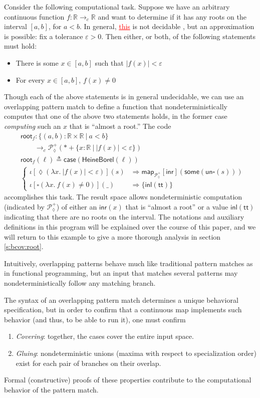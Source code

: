 \documentclass[conference]{IEEEtran}
\newcommand{\PLower}{\mathcal{P}_\lozenge}
\newcommand{\cto}{\to_c}
\newcommand{\R}{\mathbb{R}}
\newcommand{\map}[2]{\mathsf{map}_{#1}[{#2}]}
\newcommand{\fun}[2]{\lambda {#1}.\  {#2}}
\newcommand{\suchthat}{\ |\ }
\newcommand{\One}{\ast}
\newcommand{\wildcard}{\_}
\newcommand{\oinclf}[1]{\iota[{#1}]}
\newcommand{\oincl}[2]{\oinclf{#1} \left({#2}\right)}
\newcommand{\Branch}{\Rightarrow}
\newcommand{\RootFindingCode}{
&\mathsf{root}_f : \{ (a, b) : \R \times \R \suchthat a < b \}
  \\ &\qquad \cto \PLower^+(\One + \{ x : \R \suchthat |f(x)| < \varepsilon \})
\\ &\mathsf{root}_f(\ell) \triangleq \mathsf{case}(\mathsf{HeineBorel}(\ell))
\\ &\begin{cases}
\oincl{\lozenge (\fun{x}{|f(x)| < \varepsilon})}{s} 
  &\Branch \map{\PLower^+}{\mathsf{inr}}(\mathsf{some}(\mathsf{un}\square(s)))
\\ \oincl{\square (\fun{x}{f(x) \neq 0})}{\wildcard}
  &\Branch \{ \mathsf{inl}(\mathsf{tt}) \}
\end{cases}
}
\newcommand{\grammar}[1]{\textcolor{red}{\underline{#1}}}
\begin{document}
Consider the following computational task. Suppose we have an arbitrary continuous function $f : \R \cto \R$ and want to determine if it has any roots on the interval $[a,b]$, for $a < b$. In general, \grammar{this} is not decidable \cite{lamcra}, but an approximation is possible: fix a tolerance $\varepsilon > 0$. Then either, or both, of the following statements must hold:
\begin{itemize}
\item There is some $x \in [a, b]$ such that $|f(x)| < \varepsilon$
\item For every $x \in [a, b]$, $f(x) \neq 0$
\end{itemize}
Though each of the above statements is in general undecidable, we can use an overlapping pattern match to define a function that nondeterministically computes that one of the above two statements holds, in the former case \emph{computing} such an $x$ that is ``almost a root.'' The code
\begin{align*}
\RootFindingCode
\end{align*}
accomplishes this task.
The result space allows nondeterministic computation (indicated by $\PLower^+$) of either an $\mathsf{inr}(x)$ that is ``almost a root'' or a value $\mathsf{inl}(\mathsf{tt})$ indicating that there are no roots on the interval.
The notations and auxiliary definitions in this program will be explained over the course of this paper, and we will return to this example to give a more thorough analysis in section \ref{s:bcov:root}.
 
Intuitively, overlapping patterns behave much like traditional pattern matches as in functional programming, but an input that matches several patterns may nondeterministically follow any matching branch.

The syntax of an overlapping pattern match determines a unique behavioral specification, but in order to confirm that a continuous map implements such behavior (and thus, to be able to run it), one must confirm
\begin{enumerate}
\item \emph{Covering}: together, the cases cover the entire input space.
\item \emph{Gluing}: nondeterministic unions (maxima with respect to specialization order) exist for each pair of branches on their overlap.
\end{enumerate}
Formal (constructive) proofs of these properties contribute to the computational behavior of the pattern match.
\end{document}
